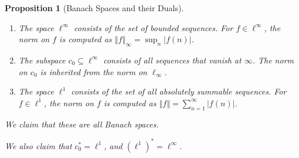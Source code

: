 \documentclass[12pt]{extarticle}
\newcommand{\norm}[1]{\left\Vert #1\right\Vert}
\theoremstyle{plain}
\newtheorem*{proposition}{Proposition}
\theoremstyle{definition}
\theoremstyle{note}
\renewcommand{\newline}{\hfill\break}
\begin{document}
\begin{proposition}[Banach Spaces and their Duals]\hfill
  \begin{enumerate}[(1)]
    \item The space $\ell^{\infty}$ consists of the set of bounded sequences. For $f\in \ell^{\infty}$, the norm on $f$ is computed as $\displaystyle\norm{f}_{\infty} = \sup_{n} \left\vert f(n) \right\vert$.
    \item The subspace $c_0\subseteq \ell^{\infty}$ consists of all sequences that vanish at $\infty$. The norm on $c_0$ is inherited from the norm on $\ell_{\infty}$.
    \item The space $\ell^{1}$ consists of the set of all absolutely summable sequences. For $f\in \ell^{1}$, the norm on $f$ is computed as $\displaystyle \norm{f} = \sum_{n=1}^{\infty}\left\vert f(n) \right\vert$.
  \end{enumerate}
  We claim that these are all Banach spaces.\newline

  We also claim that $c_0^{\ast} = \ell^1$, and $\left(\ell^{1}\right)^{\ast} = \ell^{\infty}$.
\end{proposition}
\end{document}
